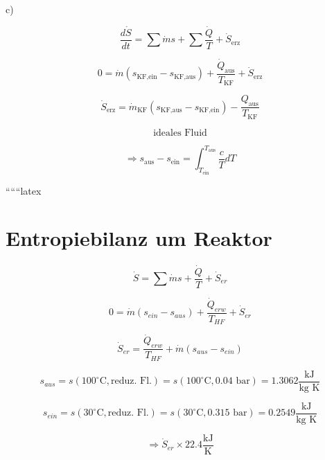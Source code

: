 c)

\[
\frac{d\dot{S}}{dt} = \sum \dot{m} s + \sum \frac{\dot{Q}}{T} + \dot{S}_{\text{erz}}
\]

\[
0 = \dot{m} (s_{\text{KF,ein}} - s_{\text{KF,aus}}) + \frac{\dot{Q}_{\text{aus}}}{T_{\text{KF}}} + \dot{S}_{\text{erz}}
\]

\[
\dot{S}_{\text{erz}} = \dot{m}_{\text{KF}} (s_{\text{KF,aus}} - s_{\text{KF,ein}}) - \frac{Q_{\text{aus}}}{T_{\text{KF}}}
\]

\[
\text{ideales Fluid}
\]

\[
\Rightarrow s_{\text{aus}} - s_{\text{ein}} = \int_{T_{\text{ein}}}^{T_{\text{aus}}} \frac{c}{T} dT
\]

``````latex


\section*{Entropiebilanz um Reaktor}

\[
\dot{S} = \sum \dot{m} s + \frac{\dot{Q}}{T} + \dot{S}_{er}
\]

\[
0 = \dot{m} (s_{ein} - s_{aus}) + \frac{\dot{Q}_{erw}}{T_{HF}} + \dot{S}_{er}
\]

\[
\dot{S}_{er} = \frac{\dot{Q}_{erw}}{T_{HF}} + \dot{m} (s_{aus} - s_{ein})
\]

\[
s_{aus} = s(100^\circ \text{C}, \text{reduz. Fl.}) = s(100^\circ \text{C}, 0.04 \text{ bar}) = 1.3062 \frac{\text{kJ}}{\text{kg K}}
\]

\[
s_{ein} = s(30^\circ \text{C}, \text{reduz. Fl.}) = s(30^\circ \text{C}, 0.315 \text{ bar}) = 0.2549 \frac{\text{kJ}}{\text{kg K}}
\]

\[
\Rightarrow \dot{S}_{er} \times 22.4 \frac{\text{kJ}}{\text{K}}
\]